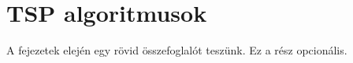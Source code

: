 \chapter{TSP algoritmusok}\label{ch:ALAP}

\begin{osszefoglal}
	A fejezetek elején egy rövid összefoglalót teszünk. Ez a rész opcionális.
	
\end{osszefoglal}

